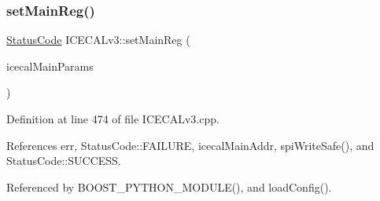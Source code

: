 \subsubsection{\texorpdfstring{set\+Main\+Reg()}{setMainReg()}}
{\footnotesize\ttfamily \hyperlink{classStatusCode}{Status\+Code} I\+C\+E\+C\+A\+Lv3\+::set\+Main\+Reg (\begin{DoxyParamCaption}\item[{Py\+Object $\ast$}]{icecal\+Main\+Params }\end{DoxyParamCaption})}



Definition at line 474 of file I\+C\+E\+C\+A\+Lv3.\+cpp.



References err, Status\+Code\+::\+F\+A\+I\+L\+U\+RE, icecal\+Main\+Addr, spi\+Write\+Safe(), and Status\+Code\+::\+S\+U\+C\+C\+E\+SS.



Referenced by B\+O\+O\+S\+T\+\_\+\+P\+Y\+T\+H\+O\+N\+\_\+\+M\+O\+D\+U\+L\+E(), and load\+Config().


